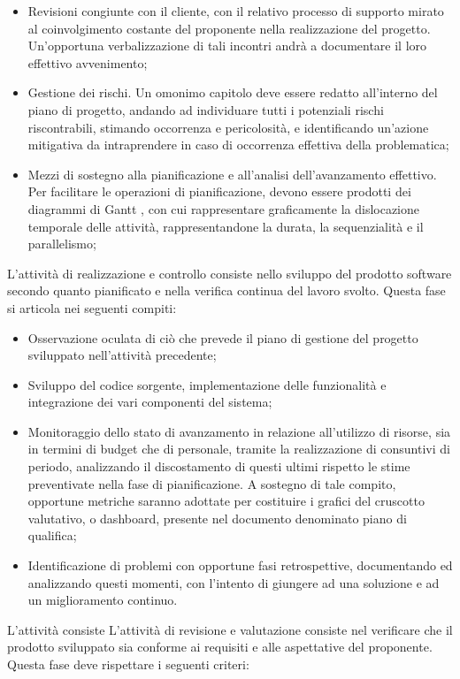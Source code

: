 \begin{enumerate}
\begin{itemize}
        \item Revisioni congiunte con il cliente, con il relativo processo di supporto mirato al coinvolgimento costante del proponente nella realizzazione del progetto. Un’opportuna verbalizzazione di tali incontri andrà a documentare il loro effettivo avvenimento;
        \item Gestione dei rischi. Un omonimo capitolo deve essere redatto all’interno del piano di progetto, andando ad individuare tutti i potenziali rischi riscontrabili, stimando occorrenza e pericolosità, e identificando un’azione mitigativa da intraprendere in caso di occorrenza effettiva della problematica;
        \item Mezzi di sostegno alla pianificazione e all’analisi dell’avanzamento effettivo. Per facilitare le operazioni di pianificazione, devono essere prodotti dei diagrammi di Gantt , con cui rappresentare graficamente la dislocazione temporale delle attività, rappresentandone la durata, la sequenzialità e il parallelismo;
\end{itemize}
L'attività di realizzazione e controllo consiste nello sviluppo del prodotto software secondo quanto pianificato e nella verifica continua del lavoro svolto. Questa fase si articola nei seguenti compiti:
\begin{itemize}
    \item Osservazione oculata di ciò che prevede il piano di gestione del progetto sviluppato nell’attività precedente;
    \item Sviluppo del codice sorgente, implementazione delle funzionalità e integrazione dei vari componenti del sistema;
    \item Monitoraggio dello stato di avanzamento in relazione all’utilizzo di risorse, sia in termini di budget che di personale, tramite la realizzazione di consuntivi di periodo, analizzando il discostamento di questi ultimi rispetto le stime preventivate nella fase di pianificazione. A sostegno di tale compito, opportune metriche saranno adottate per costituire i grafici del cruscotto valutativo, o dashboard, presente nel documento denominato piano di qualifica;
    \item Identificazione di problemi con opportune fasi retrospettive, documentando ed analizzando questi momenti, con l’intento di giungere ad una soluzione e ad un miglioramento continuo.
\end{itemize}
L'attività consiste L'attività di revisione e valutazione consiste nel verificare che il prodotto sviluppato sia conforme ai requisiti e alle aspettative del proponente. Questa fase deve rispettare i seguenti criteri:

\end{enumerate}
